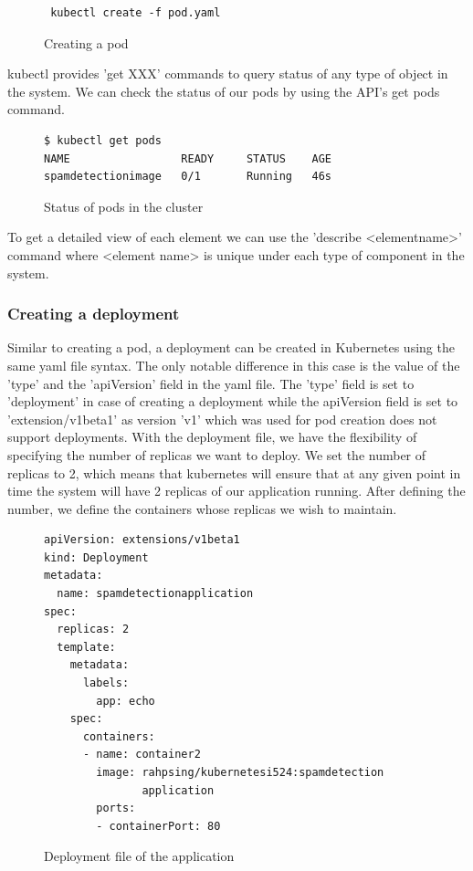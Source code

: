 \documentclass[9pt,twocolumn,twoside]{../../styles/osajnl}
\begin{document}
{\begin{figure}
\begin{verbatim}
 kubectl create -f pod.yaml
\end{verbatim}
\caption{Creating a pod}
\label{Creating a pod}
\end{figure}

\noindent
kubectl provides 'get XXX' commands to query status of any type of
object in the system. We can check the status of our pods by using the
API's get pods command.

\begin{figure}
\begin{verbatim}
$ kubectl get pods
NAME                 READY     STATUS    AGE
spamdetectionimage   0/1       Running   46s
\end{verbatim}
\caption{Status of pods in the cluster}
\label{Status of pods in the cluster}
\end{figure}
\noindent
To get a detailed view of each element we can use the 'describe
<element\textunderscore name>' command where <element\textunderscore
name> is unique under each type of component in the system.


\subsubsection{Creating a deployment}
Similar to creating a pod, a deployment can be created in Kubernetes
using the same yaml file syntax. The only notable difference in this
case is the value of the 'type' and the 'apiVersion' field in the yaml
file. The 'type' field is set to 'deployment' in case of creating a
deployment while the apiVersion field is set to 'extension/v1beta1' as
version 'v1' which was used for pod creation does not support
deployments.  With the deployment file, we have the flexibility of
specifying the number of replicas we want to deploy. We set the number
of replicas to 2, which means that kubernetes will ensure that at any
given point in time the system will have 2 replicas of our application
running. After defining the number, we define the containers whose
replicas we wish to maintain.

\begin{figure}
\begin{verbatim}
apiVersion: extensions/v1beta1
kind: Deployment
metadata:
  name: spamdetectionapplication
spec:
  replicas: 2
  template:
    metadata:
      labels:
        app: echo
    spec:
      containers:
      - name: container2
        image: rahpsing/kubernetesi524:spamdetection
               application
        ports:
        - containerPort: 80
\end{verbatim}
\caption{Deployment file of the application}
\vspace{-3mm}
\label{Deployment file of the application}
\end{figure}

}
\end{document}
